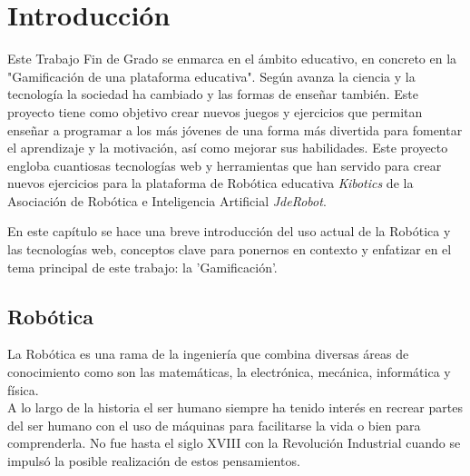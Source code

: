 
\chapter{Introducción}
\label{chap:introduccion} 
Este Trabajo Fin de Grado se enmarca en el ámbito educativo, en concreto en la "Gamificación de una plataforma educativa". Según avanza la ciencia y la tecnología la sociedad ha cambiado y las formas de enseñar también. Este proyecto tiene como objetivo crear nuevos juegos y ejercicios que permitan enseñar a programar a los más jóvenes de una forma más divertida para fomentar el aprendizaje y la motivación, así como mejorar sus habilidades. Este proyecto engloba cuantiosas tecnologías web y herramientas que han servido para crear nuevos ejercicios para la plataforma de Robótica educativa \textit{Kibotics} de la Asociación de Robótica e Inteligencia Artificial \textit{JdeRobot}.

En este capítulo se hace una breve introducción del uso actual de la Robótica y las tecnologías web, conceptos clave para ponernos en contexto y enfatizar en el tema principal de este trabajo: la 'Gamificación'.


\section{Robótica}\label{motivacion}
La Robótica es una rama de la ingeniería que combina diversas áreas de conocimiento como son las matemáticas, la electrónica, mecánica, informática y física. \\

A lo largo de la historia el ser humano siempre ha tenido interés en recrear partes del ser humano con el uso de máquinas para facilitarse la vida o bien para comprenderla. No fue hasta el siglo XVIII con  la Revolución Industrial cuando se impulsó la posible realización de estos pensamientos. 

